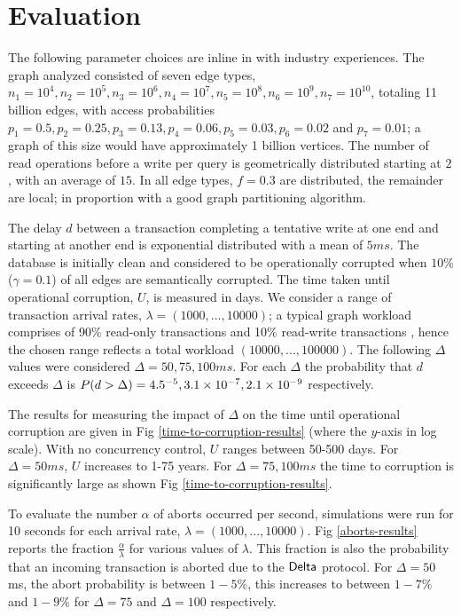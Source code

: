 \section{Evaluation}
\label{sec:evaluation}

The following parameter choices are inline in with industry experiences.
The graph analyzed consisted of seven edge types, $n_1=10^4, n_2=10^5, n_3=10^6, n_4=10^7,  n_5=10^8, n_6=10^9, n_7=10^{10}$, totaling 11 billion edges, with access probabilities $p_1 =0.5, p_2 =0.25, p_3=0.13, p_4=0.06, p_5=0.03, p_6=0.02$ and $p_7 =0.01$; a graph of this size would have approximately 1 billion vertices.
The number of read operations before a write per query is geometrically distributed starting at $2$, with an average of $15$.
In all edge types, $f=0.3$ are distributed, the remainder are local; in proportion with a good graph partitioning algorithm.


The delay $d$ between a transaction completing a tentative write at one end and starting at another end is exponential distributed with a mean of $5ms$.
The database is initially clean and considered to be operationally corrupted when $10$\% ($\gamma = 0.1$) of all edges are semantically corrupted.
The time taken until operational corruption, $U$, is measured in days.
We consider a range of transaction arrival rates, $\lambda = (1000, ..., 10000)$; a typical graph workload comprises of 90\% read-only transactions and 10\% read-write transactions \cite{Angles2020}, hence the chosen range reflects a total workload $(10000, ..., 100000)$.
The following $\Delta$ values were considered $\Delta = 50, 75, 100ms$.
For each $\Delta$ the probability that $d$ exceeds $\Delta$ is $P(d > \Delta) = 4.5 \time 10^{-5}, 3.1 \times 10^{-7}, 2.1 \times 10^{-9}$ respectively.

The results for measuring the impact of $\Delta$ on the time until operational corruption are given in Fig \ref{time-to-corruption-results} (where the $y$-axis in log scale).
With no concurrency control, $U$ ranges between 50-500 days.
For $\Delta = 50ms$,  $U$ increases to 1-75 years. For $\Delta = 75, 100ms$ the time to corruption is significantly large as shown Fig \ref{time-to-corruption-results}.

To evaluate the number $\alpha$ of aborts occurred per second, simulations were run for 10 seconds for each arrival rate, $\lambda = (1000, ..., 10000)$.
Fig \ref{aborts-results} reports the fraction $\frac{\alpha }{\lambda}$ for various values of $\lambda$. This fraction is also the probability that an incoming transaction is aborted due to the $\textsf{Delta}$ protocol.
For $\Delta = 50$ ms, the abort probability is between $1-5\%$, this increases to between $1-7\%$ and $1-9\%$ for $\Delta = 75$ and $\Delta = 100$ respectively.

